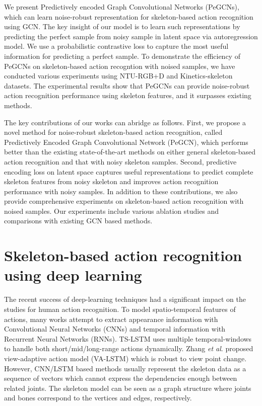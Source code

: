 \documentclass[runningheads]{llncs}
\newcommand{\etal}{\textit{et al}. }
\begin{document}
We present Predictively encoded Graph Convolutional Networks (PeGCNs), which can learn noise-robust representation for skeleton-based action recognition using GCN. The key insight of our model is to learn such representations by predicting the perfect sample from noisy sample in latent space via autoregression model. We use a probabilistic contrastive loss to capture the most useful information for predicting a perfect sample. To demonstrate the efficiency of PeGCNs on skeleton-based action recogntion with noised samples, we have conducted various experiments using NTU-RGB+D \cite{shahroudy2016ntu} and Kinetics-skeleton \cite{yan2018spatial} datasets. The experimental results show that PeGCNs can provide noise-robust action recognition performance using skeleton features, and it surpasses existing methods.

The key contributions of our works can abridge as follows. First, we propose a novel method for noise-robust skeleton-based action recognition, called Predictively Encoded Graph Convolutional Network (PeGCN), which performs better than the existing state-of-the-art methods on either general skeleton-based action recognition and that with noisy skeleton samples. Second, predictive encoding loss on latent space captures useful representations to predict complete skeleton features from noisy skeleton and improves action recognition performance with noisy samples. In addition to these contributions, we also provide comprehensive experiments on skeleton-based action recognition with noised samples. Our experiments include various ablation studies and comparisons with existing GCN based methods. 

\section{Skeleton-based action recognition using deep learning}
\label{sec:2}
The recent success of deep-learning techniques had a significant impact on the studies for human action recognition. To model spatio-temporal features of actions, many works \cite{liu2016spatio,si2018skeleton,lee2017ensemble,zhang2017view,zhu2016co,shahroudy2016ntu} attempt to extract appearance information with Convolutional Neural Networks (CNNs) and temporal information with Recurrent Neural Networks (RNNs). TS-LSTM \cite{lee2017ensemble} uses multiple temporal-windows to handle both short/mid/long-range actions dynamically. Zhang \etal \cite{zhang2017view} proposed view-adaptive action model (VA-LSTM) which is robust to view point change. However, CNN/LSTM based methods usually represent the skeleton data as a sequence of vectors which cannot express the dependencies enough between related joints. The skeleton model can be seen as a graph structure where joints and bones correspond to the vertices and edges, respectively. 
\end{document}
